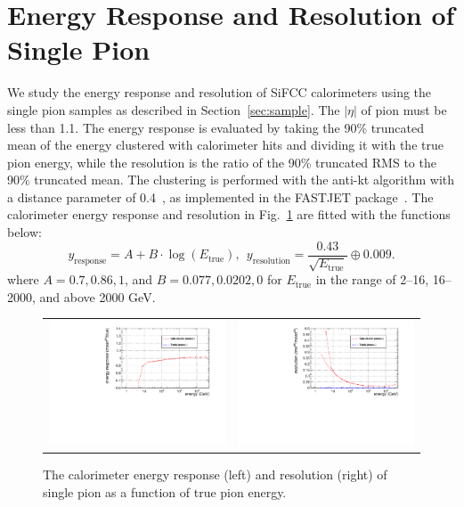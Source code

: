 \documentclass{PoS}
\begin{document}
\section{Energy Response and Resolution of Single Pion}
We study the energy response and resolution of SiFCC calorimeters using the 
single pion samples as described in Section~\ref{sec:sample}. The $\left|\eta\right|$ 
of pion must be less than 1.1. The energy 
response is evaluated by taking the 90\% truncated mean of the energy 
clustered with calorimeter hits and dividing it with the true pion energy, 
while the resolution is the ratio of the 90\% truncated RMS to 
the 90\% truncated mean. 
The clustering is performed with the anti-kt algorithm with a distance 
parameter of 0.4~\cite{Cacciari:2008gp}, as implemented in the \textsc{FASTJET}
package~\cite{fastjet}. The calorimeter energy response and resolution in 
Fig.~\ref{fig:piresponse} are fitted with the functions below:
\begin{equation}
 y_\mathrm{response} = A + B\cdot\log\left(E_\mathrm{true}\right), ~~y_\mathrm{resolution} = \frac{0.43}{\sqrt{E_\mathrm{true}}} \oplus 0.009.
\label{eq:response}
\end{equation}
where $A=0.7,0.86,1$, and $B=0.077,0.0202,0$ for $E_\mathrm{true}$ in the 
range of 2--16, 16--2000, and above 2000 GeV. 


\begin{figure}
\begin{center}
\begin{tabular}{cc}
\includegraphics[width=.5\textwidth]{figs/pi_response.pdf} & 
\includegraphics[width=.5\textwidth]{figs/pi_resolution.pdf}\\
\end{tabular}
\end{center}
\caption{The calorimeter energy response (left) and resolution (right) of single 
pion as a function of true pion energy. %
}
\label{fig:piresponse}
\end{figure}
\end{document}
